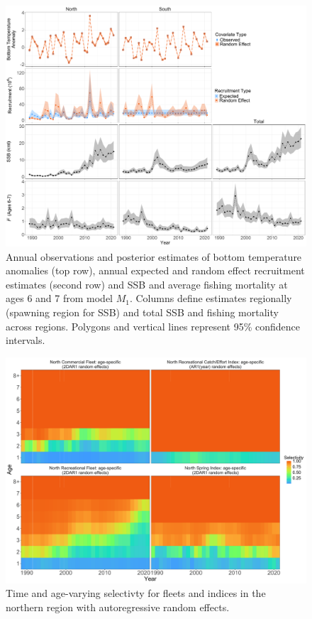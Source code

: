 \documentclass[
]{article}
\begin{document}
\begin{figure}

{\centering \includegraphics[height=0.95\textheight]{E_R_SSB_F_fig} 

}

\caption{Annual observations and posterior estimates of bottom temperature anomalies (top row), annual expected and random effect recruitment estimates (second row) and SSB and average fishing mortality at ages 6 and 7 from model $M_1$. Columns define estimates regionally (spawning region for SSB) and total SSB and fishing mortality across regions. Polygons and vertical lines represent 95\% confidence intervals.}\label{fig:E-R-SSB-F}
\end{figure}
\pagebreak

\begin{figure}

{\centering \includegraphics[height=0.95\textheight]{selectivity_re_plot} 

}

\caption{Time and age-varying selectivty for fleets and indices in the northern region with autoregressive random effects.}\label{fig:selectivity-re}
\end{figure}
\pagebreak
\end{document}
